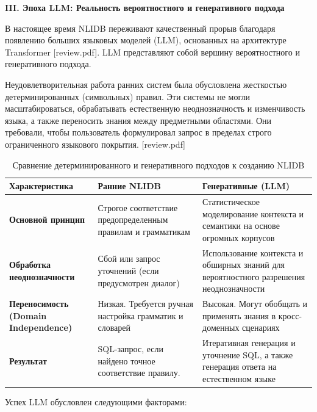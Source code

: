 \textbf{III. Эпоха LLM: Реальность вероятностного и генеративного подхода}

В настоящее время NLIDB переживают качественный прорыв благодаря появлению больших языковых моделей (LLM), основанных на архитектуре Transformer [review.pdf]. LLM представляют собой вершину вероятностного и генеративного подхода.

Неудовлетворительная работа ранних систем была обусловлена жесткостью детерминированных (символьных) правил. Эти системы не могли масштабироваться, обрабатывать естественную неоднозначность и изменчивость языка, а также переносить знания между предметными областями. Они требовали, чтобы пользователь формулировал запрос в пределах строго ограниченного языкового покрытия. [review.pdf]


\begin{table}[htbp]
    \centering
    \footnotesize
    \caption{Сравнение детерминированного и генеративного подходов к созданию NLIDB}
    \begin{tabular}{|p{3.6cm}|p{5.5cm}|p{6cm}|} \hline
    \textbf{Характеристика} & \textbf{Ранние NLIDB} & \textbf{Генеративные (LLM)} \\ \hline
    
    \textbf{Основной принцип} & 
    Строгое соответствие предопределенным правилам и грамматикам & 
    Статистическое моделирование контекста и семантики на основе огромных корпусов \\ \hline
    
    \textbf{Обработка неоднозначности} & 
    Сбой или запрос уточнений (если предусмотрен диалог) & 
    Использование контекста и обширных знаний для вероятностного разрешения неоднозначности \\ \hline
    
    \textbf{Переносимость (Domain Independence)} & 
    Низкая. Требуется ручная настройка грамматик и словарей & 
    Высокая. Могут обобщать и применять знания в кросс-доменных сценариях  \\ \hline
    
    \textbf{Результат} & 
    SQL-запрос, если найдено точное соответствие правилу. & 
    Итеративная генерация и уточнение SQL, а также генерация ответа на естественном языке \\ \hline
    
    \end{tabular}
    \label{tab:nlidb-comparison-methods}
\end{table}

Успех LLM обусловлен следующими факторами:

